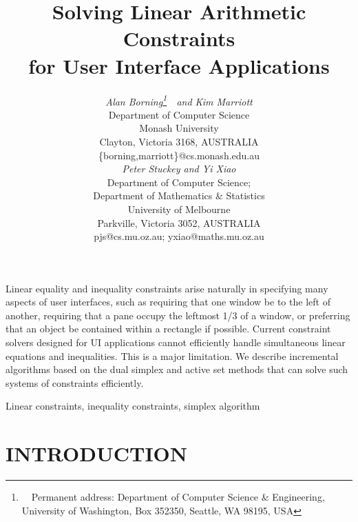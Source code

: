 \documentclass{uist96}
\begin{document}
\title{Solving Linear Arithmetic Constraints \\ 
       for User Interface Applications}

\author{
\parbox[t]{8cm}{\centering
             {\em Alan Borning\thanks{\ \ Permanent address:
Department of Computer Science \& Engineering, University of Washington,
Box 352350, Seattle, WA 98195, USA}\ \ and 
             Kim Marriott}\\
             Department of Computer Science \\
             Monash University \\
             Clayton, Victoria 3168, AUSTRALIA \\
             \{borning,marriott\}@cs.monash.edu.au} 
\parbox[t]{8cm}{\centering
             {\em Peter Stuckey and Yi Xiao}\\
             Department of Computer Science; \\ 
                  Department of Mathematics \& Statistics \\
             University of Melbourne \\
             Parkville, Victoria 3052, AUSTRALIA  \\
             pjs@cs.mu.oz.au; yxiao@maths.mu.oz.au}
}

\maketitle

\abstract Linear equality and inequality constraints arise naturally in
specifying many aspects of user interfaces, such as requiring that one
window be to the left of another, requiring that a pane occupy the leftmost
1/3 of a window, or preferring that an object be contained within a
rectangle if possible.  Current constraint solvers designed for UI
applications cannot efficiently handle simultaneous linear equations and
inequalities.  This is a major limitation.  We describe incremental
algorithms based on the dual simplex and active set methods
that can solve such systems of constraints
efficiently.  %

\keywords Linear constraints, inequality constraints, simplex algorithm


\section{INTRODUCTION}
\end{document}
